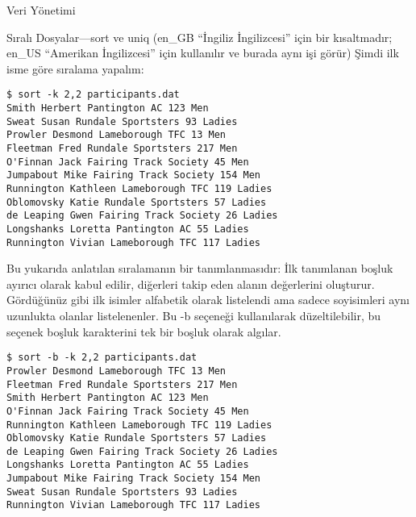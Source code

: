 \begin{section}{Veri Yönetimi}
\begin{subsection}{Sıralı Dosyalar—sort ve uniq}
(en\_GB “İngiliz İngilizcesi” için bir kısaltmadır; en\_US “Amerikan İngilizcesi” için kullanılır ve burada aynı işi görür) Şimdi ilk isme göre sıralama yapalım:
\footnotesize
\begin{verbatim}
$ sort -k 2,2 participants.dat
Smith Herbert Pantington AC 123 Men
Sweat Susan Rundale Sportsters 93 Ladies
Prowler Desmond Lameborough TFC 13 Men
Fleetman Fred Rundale Sportsters 217 Men
O'Finnan Jack Fairing Track Society 45 Men
Jumpabout Mike Fairing Track Society 154 Men
Runnington Kathleen Lameborough TFC 119 Ladies
Oblomovsky Katie Rundale Sportsters 57 Ladies
de Leaping Gwen Fairing Track Society 26 Ladies
Longshanks Loretta Pantington AC 55 Ladies
Runnington Vivian Lameborough TFC 117 Ladies
\end{verbatim}
\normalsize

Bu yukarıda anlatılan sıralamanın bir tanımlanmasıdır: İlk tanımlanan boşluk ayırıcı olarak kabul edilir, diğerleri takip eden alanın değerlerini oluşturur. Gördüğünüz gibi ilk isimler alfabetik olarak listelendi ama sadece soyisimleri aynı uzunlukta olanlar listelenenler. Bu -b seçeneği kullanılarak düzeltilebilir, bu seçenek boşluk karakterini tek bir boşluk olarak algılar.
\footnotesize
\begin{verbatim}
$ sort -b -k 2,2 participants.dat
Prowler Desmond Lameborough TFC 13 Men
Fleetman Fred Rundale Sportsters 217 Men
Smith Herbert Pantington AC 123 Men
O'Finnan Jack Fairing Track Society 45 Men
Runnington Kathleen Lameborough TFC 119 Ladies
Oblomovsky Katie Rundale Sportsters 57 Ladies
de Leaping Gwen Fairing Track Society 26 Ladies
Longshanks Loretta Pantington AC 55 Ladies
Jumpabout Mike Fairing Track Society 154 Men
Sweat Susan Rundale Sportsters 93 Ladies
Runnington Vivian Lameborough TFC 117 Ladies
\end{verbatim}
\normalsize


\end{subsection}
\end{section}
